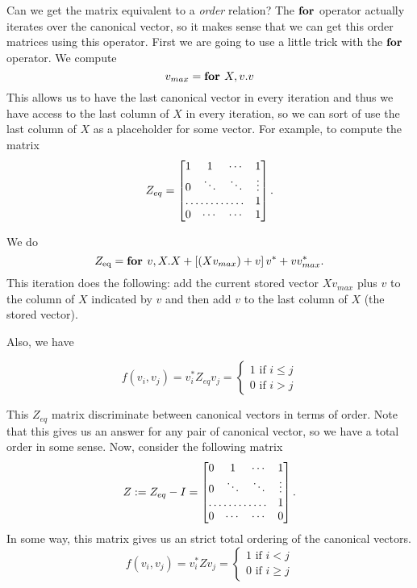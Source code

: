 Can we get the matrix equivalent to a \textit{order} relation? The $\textbf{for }$operator actually iterates over the canonical vector, so it makes sense that we can get this order matrices using this operator. First we are going to use a little trick with the $\textbf{for }$operator. We compute$$v_{max} = \textbf{for } X,v. v$$ This allows us to have the last canonical vector in every iteration and thus we have access to the last column of $X$ in every iteration, so we can sort of use the last column of $X$ as a placeholder for some vector. For example, to compute the matrix
\[
Z_{eq} = \begin{bmatrix}
    1 & 1 & \cdots &  1 \\
    0 & \ddots & \ddots & \vdots \\
    \hdotsfor{3} & 1 \\
    0 & \cdots & \cdots & 1 
\end{bmatrix}.
\]

We do $$Z_{\text{eq}}=\textbf{for } v,X. X + \left[ (Xv_{max}) + v \right]v^* + vv^*_{max}.$$ This iteration does the following: add the current stored vector $Xv_{max}$ plus $v$ to the column of $X$ indicated by $v$ and then add $v$ to the last column of $X$ (the stored vector).

Also, we have

\[
  			f(v_i, v_j)=v_i^*Z_{eq}v_j=\begin{cases}
               1 \text{ if } i \leq j \\
               0 \text{ if } i > j
            \end{cases}
\]

This $Z_{eq}$ matrix discriminate between canonical vectors in terms of order. Note that this gives us an answer for any pair of canonical vector, so we have a total order in some sense.
Now, consider the following matrix
\[
Z:=Z_{eq} - I = \begin{bmatrix}
    0 & 1 & \cdots &  1 \\
    0 & \ddots & \ddots & \vdots \\
    \hdotsfor{3} & 1 \\
    0 & \cdots & \cdots & 0 
\end{bmatrix}.
\]
In some way, this matrix gives us an strict total ordering of the canonical vectors.
\[
  			f(v_i, v_j)=v_i^*Zv_j=\begin{cases}
               1 \text{ if } i < j \\
               0 \text{ if } i \geq j
            \end{cases}
		\]
		

